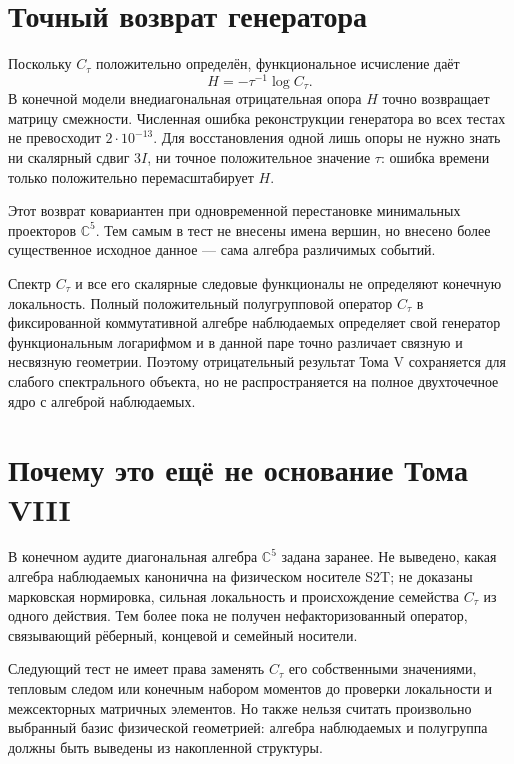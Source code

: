 \section{Точный возврат генератора}

Поскольку $C_\tau$ положительно определён, функциональное исчисление даёт
\begin{equation}
 H=-\tau^{-1}\log C_\tau.
 \label{eq:v8-kernel-log-return}
\end{equation}
В конечной модели внедиагональная отрицательная опора $H$ точно возвращает
матрицу смежности. Численная ошибка реконструкции генератора во всех тестах
не превосходит $2\cdot10^{-13}$. Для восстановления одной лишь опоры не
нужно знать ни скалярный сдвиг $3I$, ни точное положительное значение
$\tau$: ошибка времени только положительно перемасштабирует $H$.

Этот возврат ковариантен при одновременной перестановке минимальных
проекторов $\mathbb C^5$. Тем самым в тест не внесены имена вершин, но
внесено более существенное исходное данное --- сама алгебра различимых
событий.

\begin{theorem}
Спектр $C_\tau$ и все его скалярные следовые функционалы не определяют
конечную локальность. Полный положительный полугрупповой оператор
$C_\tau$ в фиксированной коммутативной алгебре наблюдаемых определяет свой
генератор функциональным логарифмом и в данной паре точно различает
связную и несвязную геометрии. Поэтому отрицательный результат Тома V
сохраняется для слабого спектрального объекта, но не распространяется на
полное двухточечное ядро с алгеброй наблюдаемых.
\end{theorem}

\section{Почему это ещё не основание Тома VIII}

В конечном аудите диагональная алгебра $\mathbb C^5$ задана заранее. Не
выведено, какая алгебра наблюдаемых канонична на физическом носителе S2T;
не доказаны марковская нормировка, сильная локальность и происхождение
семейства $C_\tau$ из одного действия. Тем более пока не получен
нефакторизованный оператор, связывающий рёберный, концевой и семейный
носители.

\begin{nogocriterion}
Следующий тест не имеет права заменять $C_\tau$ его собственными значениями,
тепловым следом или конечным набором моментов до проверки локальности и
межсекторных матричных элементов. Но также нельзя считать произвольно
выбранный базис физической геометрией: алгебра наблюдаемых и полугруппа
должны быть выведены из накопленной структуры.
\end{nogocriterion}

